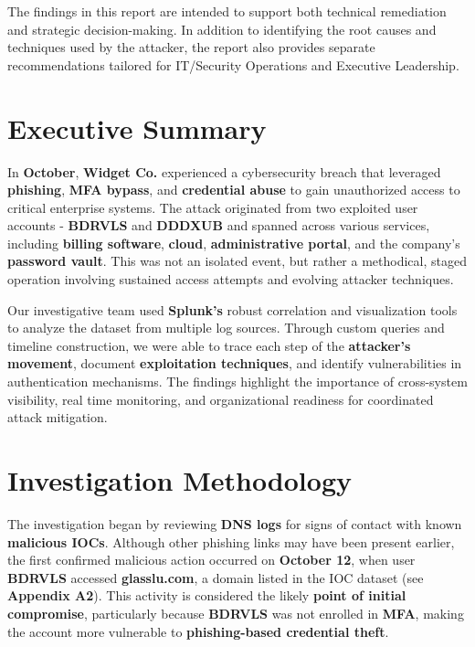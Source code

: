 \documentclass[11pt]{article}
\begin{document}
		\vspace{1em}
		\hspace{0.2em} The findings in this report are intended to support both technical remediation and strategic decision-making. In addition to identifying the root causes and techniques used by the attacker, the report also provides separate recommendations tailored for IT/Security Operations and Executive Leadership.

	\newpage
	
	\tableofcontents
	\newpage
	
	\setcounter{page}{1}
	\section{Executive Summary}
	
	\hspace{1.5em} In \textbf{October}, \textbf{Widget Co.} experienced a cybersecurity breach that leveraged \textbf{phishing}, \textbf{MFA bypass}, and \textbf{credential abuse} to gain unauthorized access to critical enterprise systems. The attack originated from two exploited user accounts - \textbf{BDRVLS} and \textbf{DDDXUB} and spanned across various services, including \textbf{billing software}, \textbf{cloud}, \textbf{administrative portal}, and the company’s \textbf{password vault}. This was not an isolated event, but rather a methodical, staged operation involving sustained access attempts and evolving attacker techniques.
	
	\vspace{1em}
	\par Our investigative team used \textbf{Splunk’s} robust correlation and visualization tools to analyze the dataset from multiple log sources. Through custom queries and timeline construction, we were able to trace each step of the \textbf{attacker’s movement}, document \textbf{exploitation techniques}, and identify vulnerabilities in authentication mechanisms. The findings highlight the importance of cross-system visibility, real time monitoring, and organizational readiness for coordinated attack mitigation.
	
	\newpage
	\section{Investigation Methodology}
	
	\hspace{1.5em} The investigation began by reviewing \textbf{DNS logs} for signs of contact with known \textbf{malicious IOCs}. Although other phishing links may have been present earlier, the first confirmed malicious action occurred on \textbf{October 12}, when user \textbf{BDRVLS} accessed \textbf{glasslu.com}, a domain listed in the IOC dataset (see \textbf{Appendix A2}). This activity is considered the likely \textbf{point of initial compromise}, particularly because \textbf{BDRVLS} was not enrolled in \textbf{MFA}, making the account more vulnerable to \textbf{phishing-based credential theft}.
	
\end{document}
